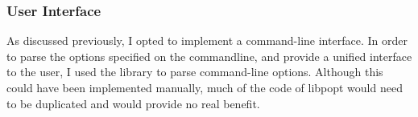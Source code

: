 \subsubsection{User Interface}
As discussed previously, I opted to implement a command-line interface. In order to parse the options specified on the commandline, and provide a unified interface to the user, I used the  library to parse command-line options. Although this could have been implemented manually, much of the code of libpopt would need to be duplicated and would provide no real benefit.
\begin{comment}
	\begin{itemize}
		\item Give background on libraries used and what they are used for
		\item Give alternatives to some libraries and explain why they wern't used (Marsyas and MAAATE)
		\begin{itemize}
			\item lack of knowledge of libraries - would have taken as long to learn it as to have written it myself
			\item too big to leverage into the proof-of-concept example needed
			\item wouldn't allow as much flexibility in operation of the program
			\item this way is easier to modify in future to add more extractors / build on in any way
			\item why they would have been good
			\begin{itemize}
				\item easier to chop and change between features (not important for my project)
				\item ?
			\end{itemize}
		\end{itemize}
		\item GStreamer (vs. libmad, libogg/vorbis, libflac; directsound)
		\item libsndfile
		\item FFTW3 (vs. hand coded - OMG)
		\item libpopt (vs. hand coded - just lazy)
	\end{itemize}
\end{comment}

